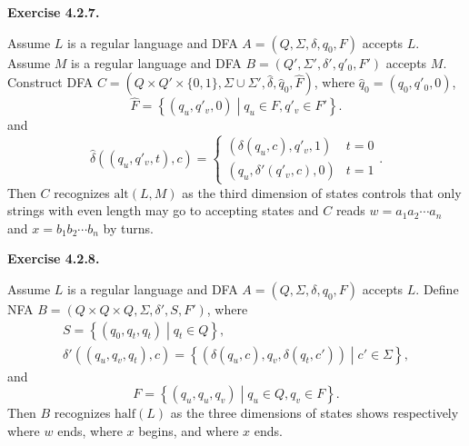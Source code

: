 \documentclass[a4paper]{article}
\newenvironment{exercise}[1]{
	\par
	\noindent\textbf{Exercise #1.}\quad
}{
	\par
	\bigskip
}
\begin{document}
\begin{exercise}{4.2.7}
    Assume $L$ is a regular language and DFA $A=(Q,\Sigma,\delta,q_0,F)$ accepts $L$.
    Assume $M$ is a regular language and DFA $B=(Q',\Sigma',\delta',q'_0,F')$ accepts $M$.
    Construct DFA $C=(Q\times Q'\times\{0,1\},\Sigma\cup\Sigma',\hat{\delta},\hat{q}_0,\hat{F})$, where $\hat{q}_0=(q_0,q'_0,0)$, 
    $$
    \hat{F}=\left\{(q_u,q'_v,0)\middle|q_u\in F,q'_v\in F'\right\}.
    $$
    and 
    $$
    \hat{\delta}\left((q_u,q'_v,t),c\right)=\begin{cases}
        (\delta(q_u,c),q'_v,1) & t=0\\
        (q_u,\delta'(q'_v,c),0) & t=1
    \end{cases}.
    $$
    Then $C$ recognizes $\text{alt}(L,M)$ as the third dimension of states controls that 
    only strings with even length may go to 
    accepting states and $C$ reads $w=a_1a_2\cdots a_n$ and $x=b_1b_2\cdots b_n$ by turns.
\end{exercise}

\begin{exercise}{4.2.8}
    Assume $L$ is a regular language and DFA $A=(Q,\Sigma,\delta,q_0,F)$ accepts $L$.
    Define NFA $B=(Q\times Q\times Q,\Sigma,\delta',S,F')$, where 
    \begin{gather*}
        S=\left\{(q_0,q_t,q_t)\middle|q_t\in Q\right\},\\
    \delta'\left((q_u,q_v,q_t),c\right)=\left\{(\delta(q_u,c),q_v,\delta(q_t,c'))\middle|c'\in\Sigma\right\},
    \end{gather*}
    and 
    $$
    F=\left\{(q_u,q_u,q_v)\middle|q_u\in Q,q_v\in F\right\}.
    $$
    Then $B$ recognizes $\text{half}(L)$ as the three dimensions of states shows respectively
    where $w$ ends, where $x$ begins, and where $x$ ends.
\end{exercise}
\end{document}
